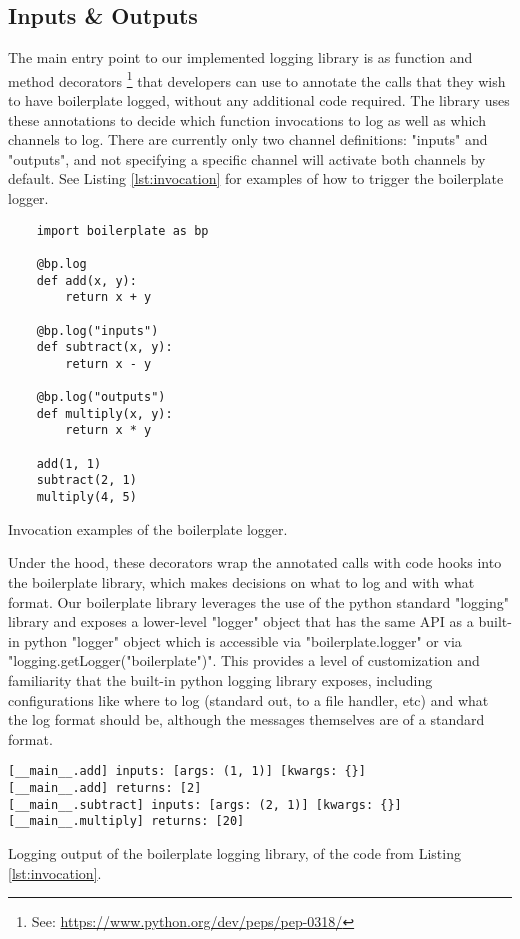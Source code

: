 \documentclass[acmsmall,review,authorversion]{acmart}
\begin{document}
\subsection{Inputs \& Outputs}

The main entry point to our implemented logging library is as function and method decorators \footnote{See: \href{https://www.python.org/dev/peps/pep-0318/}{https://www.python.org/dev/peps/pep-0318/}} that developers can use to annotate the calls that they wish to have boilerplate logged, without any additional code required. The library uses these annotations to decide which function invocations to log as well as which channels to log. There are currently only two channel definitions: "inputs" and "outputs", and not specifying a specific channel will activate both channels by default. See Listing \ref{lst:invocation} for examples of how to trigger the boilerplate logger.

\begin{listing}[H]
    \begin{verbatim}
    import boilerplate as bp

    @bp.log
    def add(x, y):
        return x + y

    @bp.log("inputs")
    def subtract(x, y):
        return x - y

    @bp.log("outputs")
    def multiply(x, y):
        return x * y

    add(1, 1)
    subtract(2, 1)
    multiply(4, 5)
    \end{verbatim}
    \caption{Invocation examples of the boilerplate logger.}
    \label{lst:invocation}
\end{listing}

Under the hood, these decorators wrap the annotated calls with code hooks into the boilerplate library, which makes decisions on what to log and with what format. Our boilerplate library leverages the use of the python standard "logging" library and exposes a lower-level "logger" object that has the same API as a built-in python "logger" object which is accessible via "boilerplate.logger" or via "logging.getLogger("boilerplate")". This provides a level of customization and familiarity that the built-in python logging library exposes, including configurations like where to log (standard out, to a file handler, etc) and what the log format should be, although the messages themselves are of a standard format.

\begin{listing}[H]
    \begin{verbatim}
[__main__.add] inputs: [args: (1, 1)] [kwargs: {}]
[__main__.add] returns: [2]
[__main__.subtract] inputs: [args: (2, 1)] [kwargs: {}]
[__main__.multiply] returns: [20]
    \end{verbatim}
    \caption{Logging output of the boilerplate logging library, of the code from Listing \ref{lst:invocation}.}
    \label{lst:log-examples}
\end{listing}
\end{document}
